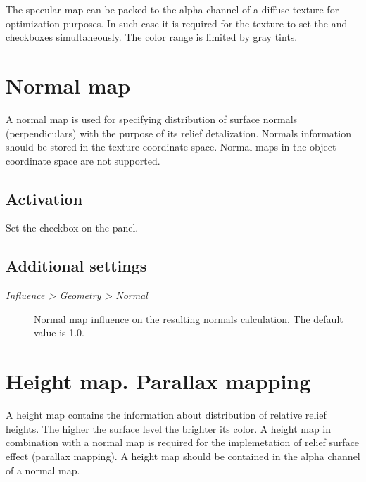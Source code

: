 \documentclass[a4paper,12pt,oneside]{sphinxmanual}
\begin{document}
The specular map can be packed to the alpha channel of a diffuse texture for optimization purposes. In such case it is required for the texture to set the  and  checkboxes simultaneously. The color range is limited by gray tints.


\section{Normal map}
\label{textures:index-6}\label{textures:normal-map}
A normal map is used for specifying distribution of surface normals (perpendiculars) with the purpose of its relief detalization. Normals information should be stored in the texture coordinate space. Normal maps in the object coordinate space are not supported.


\subsection{Activation}
\label{textures:id8}
Set the  checkbox on the  panel.


\subsection{Additional settings}
\label{textures:id9}\begin{description}
\item[{\emph{Influence \textgreater{} Geometry \textgreater{} Normal}}] \leavevmode
Normal map influence on the resulting normals calculation. The default value is 1.0.

\end{description}


\section{Height map. Parallax mapping}
\label{textures:index-7}\label{textures:height-map-parallax-mapping}
A height map contains the information about distribution of relative relief heights. The higher the surface level the brighter its color. A height map in combination with a normal map is required for the implemetation of relief surface effect (parallax mapping). A height map should be contained in the alpha channel of a normal map.
\end{document}
